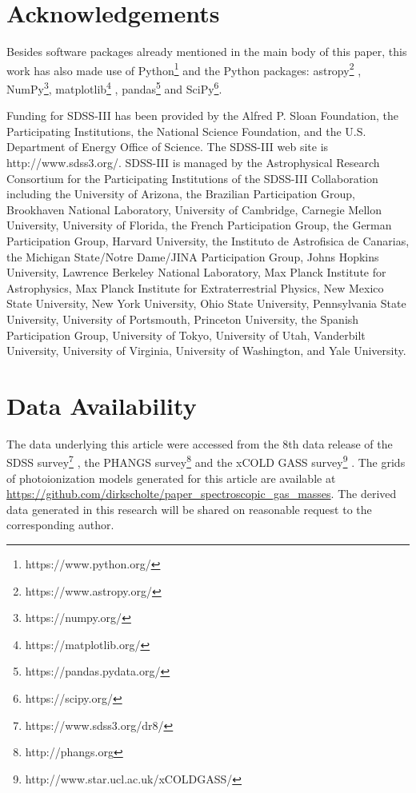 \documentclass[fleqn,usenatbib]{mnras}
\begin{document}
\section*{Acknowledgements}
Besides software packages already mentioned in the main body of this paper, this work has also made use of Python\footnote{https://www.python.org/} and the Python packages: astropy\footnote{https://www.astropy.org/} \citep{astropy2013}, NumPy\footnote{https://numpy.org/}, matplotlib\footnote{https://matplotlib.org/} \citep{hunter2007}, pandas\footnote{https://pandas.pydata.org/} \citep{reback2020} and SciPy\footnote{https://scipy.org/}.

Funding for SDSS-III has been provided by the Alfred P. Sloan Foundation, the Participating Institutions, the National Science Foundation, and the U.S. Department of Energy Office of Science. The SDSS-III web site is http://www.sdss3.org/. SDSS-III is managed by the Astrophysical Research Consortium for the Participating Institutions of the SDSS-III Collaboration including the University of Arizona, the Brazilian Participation Group, Brookhaven National Laboratory, University of Cambridge, Carnegie Mellon University, University of Florida, the French Participation Group, the German Participation Group, Harvard University, the Instituto de Astrofisica de Canarias, the Michigan State/Notre Dame/JINA Participation Group, Johns Hopkins University, Lawrence Berkeley National Laboratory, Max Planck Institute for Astrophysics, Max Planck Institute for Extraterrestrial Physics, New Mexico State University, New York University, Ohio State University, Pennsylvania State University, University of Portsmouth, Princeton University, the Spanish Participation Group, University of Tokyo, University of Utah, Vanderbilt University, University of Virginia, University of Washington, and Yale University.  

\section*{Data Availability}

The data underlying this article were accessed from the 8th data release of the SDSS survey\footnote{https://www.sdss3.org/dr8/} \citep{abazajian2009}, the PHANGS survey\footnote{http://phangs.org} \citep{emsellem2021,leroy2021} and the xCOLD GASS survey\footnote{http://www.star.ucl.ac.uk/xCOLDGASS/} \citep{saintonge2017}. The grids of photoionization models generated for this article are available at \href{https://github.com/dirkscholte/paper_spectroscopic_gas_masses}{https://github.com/dirkscholte/paper\_spectroscopic\_gas\_masses}. The derived data generated in this research will be shared on reasonable request to the corresponding author.
\end{document}
